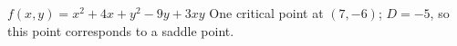 {$f(x,y) = x^2+4x+y^2-9y+3xy$
}
{
One critical point at $(7,-6)$; $D = -5$, so this point corresponds to a saddle point.
}